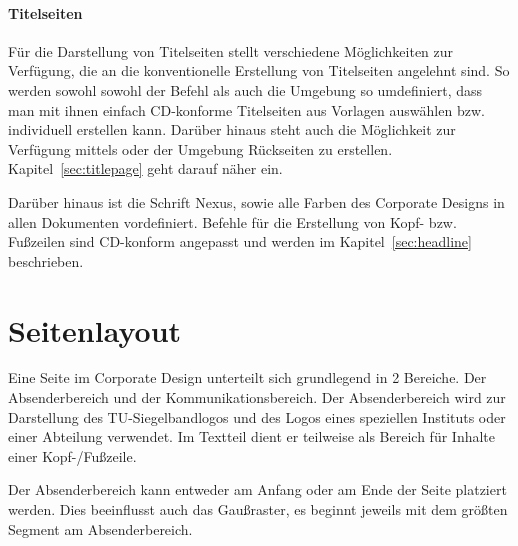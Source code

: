 \paragraph{Titelseiten}
Für die Darstellung von Titelseiten stellt \tubslatex verschiedene Möglichkeiten
zur Verfügung, die an die konventionelle Erstellung von Titelseiten angelehnt
sind. So werden sowohl sowohl der Befehl  als auch die Umgebung
 so umdefiniert, dass man mit ihnen einfach CD-konforme
Titelseiten aus Vorlagen auswählen bzw. individuell erstellen kann.
Darüber hinaus steht auch die Möglichkeit zur Verfügung mittels
 oder der Umgebung 
Rückseiten zu erstellen. Kapitel~\ref{sec:titlepage} geht darauf näher ein.
\bigskip


Darüber hinaus ist die Schrift Nexus, sowie alle Farben des Corporate Designs
in allen Dokumenten vordefiniert.
Befehle für die Erstellung von Kopf- bzw. Fußzeilen sind CD-konform angepasst und
werden im Kapitel~\ref{sec:headline} beschrieben.


\section{Seitenlayout}\label{sec:pagelayout}

Eine Seite im Corporate Design unterteilt sich grundlegend in 2 Bereiche.
Der Absenderbereich und der Kommunikationsbereich. Der Absenderbereich wird zur
Darstellung des TU-Siegelbandlogos und des Logos eines speziellen Instituts
oder einer Abteilung verwendet. Im Textteil dient er teilweise als Bereich für
Inhalte einer Kopf-/Fußzeile.

Der Absenderbereich kann entweder am Anfang oder am Ende der Seite platziert
werden. Dies beeinflusst auch das Gaußraster, es beginnt jeweils mit dem
größten Segment am Absenderbereich.
\bigskip


